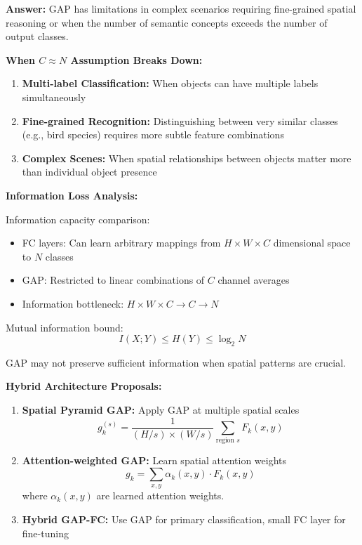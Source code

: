 \documentclass[12pt]{article}
\newcommand{\answer}[1]{{\color{answercolor}\textbf{Answer:} #1}}
\newcommand{\explanation}[1]{{\color{explanationcolor}#1}}
\begin{document}
\begin{enumerate}[(a)]
    \answer{GAP has limitations in complex scenarios requiring fine-grained spatial reasoning or when the number of semantic concepts exceeds the number of output classes.}
    
    \explanation{
    \textbf{When $C \approx N$ Assumption Breaks Down:}
    
    \begin{enumerate}
        \item \textbf{Multi-label Classification:} When objects can have multiple labels simultaneously
        \item \textbf{Fine-grained Recognition:} Distinguishing between very similar classes (e.g., bird species) requires more subtle feature combinations
        \item \textbf{Complex Scenes:} When spatial relationships between objects matter more than individual object presence
    \end{enumerate}
    
    \textbf{Information Loss Analysis:}
    
    Information capacity comparison:
    \begin{itemize}
        \item FC layers: Can learn arbitrary mappings from $H \times W \times C$ dimensional space to $N$ classes
        \item GAP: Restricted to linear combinations of $C$ channel averages
        \item Information bottleneck: $H \times W \times C \rightarrow C \rightarrow N$
    \end{itemize}
    
    Mutual information bound:
    $$I(X; Y) \leq H(Y) \leq \log_2 N$$
    
    GAP may not preserve sufficient information when spatial patterns are crucial.
    
    \textbf{Hybrid Architecture Proposals:}
    
    \begin{enumerate}
        \item \textbf{Spatial Pyramid GAP:} Apply GAP at multiple spatial scales
        $$g_k^{(s)} = \frac{1}{(H/s) \times (W/s)} \sum_{\text{region } s} F_k(x,y)$$
        
        \item \textbf{Attention-weighted GAP:} Learn spatial attention weights
        $$g_k = \sum_{x,y} \alpha_{k}(x,y) \cdot F_k(x,y)$$
        where $\alpha_k(x,y)$ are learned attention weights.
        
        \item \textbf{Hybrid GAP-FC:} Use GAP for primary classification, small FC layer for fine-tuning
    \end{enumerate}
    }
\end{enumerate}
\end{document}
